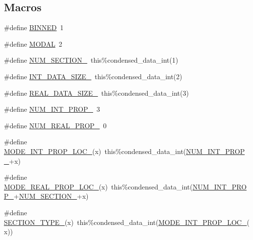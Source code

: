 \subsection*{Macros}
\begin{DoxyCompactItemize}
\item 
\#define \mbox{\hyperlink{aero__rep__modal__binned__mass_8_f90_a1c40fbd8643dc7cec0ed57056faf021c}{B\+I\+N\+N\+ED}}~1
\item 
\#define \mbox{\hyperlink{aero__rep__modal__binned__mass_8_f90_acdc340df3f65455d5b957345be3a6eff}{M\+O\+D\+AL}}~2
\item 
\#define \mbox{\hyperlink{aero__rep__modal__binned__mass_8_f90_a2bbf59e5f8e339a8a3ef9f64af23c0be}{N\+U\+M\+\_\+\+S\+E\+C\+T\+I\+O\+N\+\_\+}}~this\%condensed\+\_\+data\+\_\+int(1)
\item 
\#define \mbox{\hyperlink{aero__rep__modal__binned__mass_8_f90_aa0dffbf9b27f4705b9462d86376d1506}{I\+N\+T\+\_\+\+D\+A\+T\+A\+\_\+\+S\+I\+Z\+E\+\_\+}}~this\%condensed\+\_\+data\+\_\+int(2)
\item 
\#define \mbox{\hyperlink{aero__rep__modal__binned__mass_8_f90_a954a7ebe1684bc64b782f0220800a839}{R\+E\+A\+L\+\_\+\+D\+A\+T\+A\+\_\+\+S\+I\+Z\+E\+\_\+}}~this\%condensed\+\_\+data\+\_\+int(3)
\item 
\#define \mbox{\hyperlink{aero__rep__modal__binned__mass_8_f90_a13ba1b28e3d8a5e60eec52ce6bbabe4f}{N\+U\+M\+\_\+\+I\+N\+T\+\_\+\+P\+R\+O\+P\+\_\+}}~3
\item 
\#define \mbox{\hyperlink{aero__rep__modal__binned__mass_8_f90_aa9808eb54fa06bcf890dd1aa1fc6ca5b}{N\+U\+M\+\_\+\+R\+E\+A\+L\+\_\+\+P\+R\+O\+P\+\_\+}}~0
\item 
\#define \mbox{\hyperlink{aero__rep__modal__binned__mass_8_f90_a585bf55299f2d71372c7f9bc903b91b2}{M\+O\+D\+E\+\_\+\+I\+N\+T\+\_\+\+P\+R\+O\+P\+\_\+\+L\+O\+C\+\_\+}}(x)~this\%condensed\+\_\+data\+\_\+int(\mbox{\hyperlink{rxn__arrhenius_8_f90_a13ba1b28e3d8a5e60eec52ce6bbabe4f}{N\+U\+M\+\_\+\+I\+N\+T\+\_\+\+P\+R\+O\+P\+\_\+}}+x)
\item 
\#define \mbox{\hyperlink{aero__rep__modal__binned__mass_8_f90_ab695417de3b45908793bd92ca251cf91}{M\+O\+D\+E\+\_\+\+R\+E\+A\+L\+\_\+\+P\+R\+O\+P\+\_\+\+L\+O\+C\+\_\+}}(x)~this\%condensed\+\_\+data\+\_\+int(\mbox{\hyperlink{rxn__arrhenius_8_f90_a13ba1b28e3d8a5e60eec52ce6bbabe4f}{N\+U\+M\+\_\+\+I\+N\+T\+\_\+\+P\+R\+O\+P\+\_\+}}+\mbox{\hyperlink{aero__rep__modal__binned__mass_8_f90_a2bbf59e5f8e339a8a3ef9f64af23c0be}{N\+U\+M\+\_\+\+S\+E\+C\+T\+I\+O\+N\+\_\+}}+x)
\item 
\#define \mbox{\hyperlink{aero__rep__modal__binned__mass_8_f90_a5990ecb35a15458808481d3e89b1d221}{S\+E\+C\+T\+I\+O\+N\+\_\+\+T\+Y\+P\+E\+\_\+}}(x)~this\%condensed\+\_\+data\+\_\+int(\mbox{\hyperlink{aero__rep__modal__binned__mass_8_f90_a585bf55299f2d71372c7f9bc903b91b2}{M\+O\+D\+E\+\_\+\+I\+N\+T\+\_\+\+P\+R\+O\+P\+\_\+\+L\+O\+C\+\_\+}}(x))

\end{DoxyCompactItemize}
